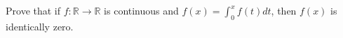 Prove that if $f : \mathbb{R} \to \mathbb{R}$ is continuous and $f(x) =
\displaystyle{\int_{0}^{x} f(t) dt}$, then $f(x)$ is identically zero.
